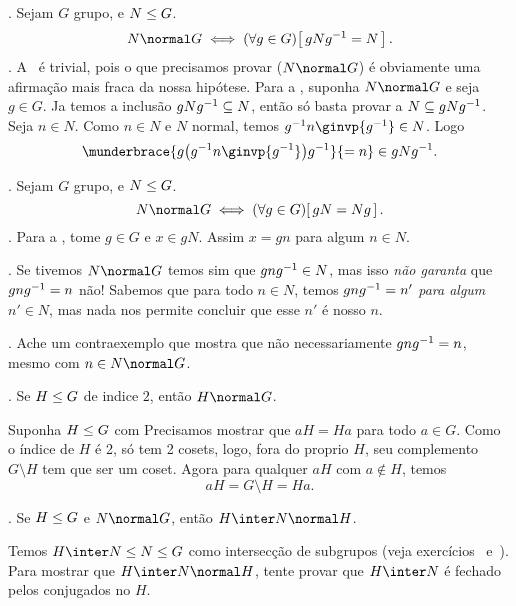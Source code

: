 \lemma.
\label{normal_subgroup_altdef_gNginvg_eq_N}%
%
Sejam $G$ grupo, e $N\leq G$.
$$
N\normal G
\iff
\lforall{g\in G}
{gN\ginv g = N}.
$$
\sketch.
A \rldir\ é trivial, pois o que precisamos provar ($N \normal G$) é obviamente uma afirmação mais fraca da nossa hipótese.
Para a \lrdir, suponha $N \normal G$ e seja $g\in G$.  Ja temos a inclusão $gN{g}^{-1} \subseteq N$, então só basta provar
a $N \subseteq gN{g}^{-1}$.  Seja $n \in N$.
Como $n \in N$ e $N$ normal, temos $\ginv g n \ginvp{\ginv g} \in N$.
Logo
$$
\munderbrace {g \paren{\ginv g n \ginvp{\ginv g}} \ginv g} {=n} \in gN\ginv g.
$$
\qes

\lemma.
\label{normal_subgroup_altdef_gN_eq_Ng}%
%
Sejam $G$ grupo, e $N\leq G$.
$$
N\normal G
\iff
\lforall{g\in G}
{gN = Ng}.
$$
\sketch.
Para a \lrdir, tome $g\in G$ e $x \in gN$.
Assim $x = gn$ para algum $n\in N$.
\qes

\beware.
Se tivemos $N \normal G$ temos sim que $gn{g}^{-1} \in N$,
mas isso \emph{não garanta} que $gn{g}^{-1} = n$ não!
Sabemos que para todo $n\in N$, temos $gn{g}^{-1} = n'$ \emph{para algum}
$n' \in N$, mas nada nos permite concluir que esse $n'$ é nosso $n$.

\exercise.
\label{gnginvg_neq_n}%
Ache um contraexemplo que mostra que não necessariamente
$gn{g}^{-1} = n$, mesmo com $n\in N \normal G$.

\endexercise

\exercise.
\label{cosets_of_subgroup_of_index_2}
Se $H\leq G$ de indice $2$, então $H \normal G$.

\solution
Suponha $H\leq G$ com 
Precisamos mostrar que $aH = Ha$ para todo $a\in G$.
Como o índice de $H$ é 2, só tem 2 cosets, logo, fora do proprio $H$, seu
complemento $G\setminus H$ tem que ser um coset.
Agora para qualquer $aH$ com $a \notin H$, temos
$$
aH = G\setminus H = Ha.
$$

\endexercise

\exercise.
\label{inter_of_subgroup_and_normal_is_normal_in_subgroup}%
Se $H\leq G$ e $N\normal G$, então $H\inter N \normal H$.

\hint
Temos $H \inter N \subgroup N \subgroup G$ como intersecção de subgrupos
(veja exercícios~
e~).
Para mostrar que $H \inter N \normal H$,
tente provar que $H\inter N$ é fechado pelos conjugados no $H$.

